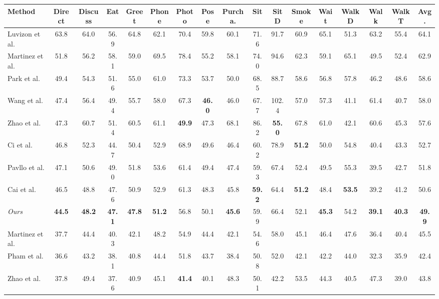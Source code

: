 \documentclass[runningheads]{llncs}
\begin{document}
\begin{table*}
\begin{center}
\resizebox{\textwidth}{30mm}
{
\begin{tabular}{ l c c c c c c c c c c c c c c c c }
\hline
Method & Direct & Discuss & Eat & Greet & Phone& Photo & Pose  & Purcha. & Sit & SitD &Smoke &Wait &WalkD&Walk& WalkT & Avg.\\
\hline
Luvizon et al. \cite{luvizon20182d}& 63.8 & 64.0 & 56.9 & 64.8 & 62.1 & 70.4 & 59.8 & 60.1&71.6 & 91.7 &60.9 & 65.1 & 51.3 & 63.2 & 55.4 & 64.1  \\ 
Martinez et al. \cite{martinez2017simple}& 51.8 &56.2 &58.1 &59.0 &69.5 &78.4 &55.2 &58.1& 74.0& 94.6 &62.3 &59.1& 65.1& 49.5& 52.4 &62.9 \\
Park et al.\cite{park20183d}&49.4 &54.3& 51.6& 55.0& 61.0 &73.3 &53.7 &50.0& 68.5& 88.7 &58.6 &56.8& 57.8& 46.2 &48.6 &58.6\\
Wang et al. \cite{wang2019generalizing}&47.4 &56.4 &49.4 &55.7& 58.0& 67.3& \textbf{46.0}& 46.0& 67.7& 102.4& 57.0& 57.3& 41.1& 61.4& 40.7 &58.0\\
Zhao et al. \cite{zhao2019semantic}&47.3 &60.7& 51.4& 60.5& 61.1 &\textbf{49.9} &47.3 &68.1& 86.2& \textbf{55.0}& 67.8& 61.0& 42.1& 60.6& 45.3& 57.6\\
Ci et al. \cite{ci2019optimizing}&46.8 &52.3& 44.7& 50.4& 52.9& 68.9& 49.6& 46.4& 60.2 &78.9& \textbf{51.2}& 50.0& 54.8& 40.4& 43.3& 52.7\\
Pavllo et al. \cite{pavllo20193d} &47.1& 50.6& 49.0& 51.8 &53.6 &61.4& 49.4 &47.4 &59.3 &67.4 &52.4& 49.5& 55.3& 39.5& 42.7& 51.8\\
Cai et al. \cite{cai2019exploiting}&46.5 &48.8 &47.6& 50.9& 52.9 &61.3 &48.3 &45.8 &\textbf{59.2} &64.4& \textbf{51.2}& 48.4& \textbf{53.5}& 39.2& 41.2& 50.6\\
\emph{Ours} &\textbf{44.5}&\textbf{48.2}&\textbf{47.1}&\textbf{47.8}&\textbf{51.2}&56.8&50.1&\textbf{45.6}&59.9&66.4&52.1&\textbf{45.3}&54.2&\textbf{39.1}&\textbf{40.3}&\textbf{49.9}\\
\hline
\hline
Martinez et al. \cite{martinez2017simple} &37.7 &44.4 &40.3 &42.1& 48.2& 54.9 &44.4 &42.1 &54.6& 58.0 &45.1 &46.4 &47.6 &36.4 &40.4& 45.5\\
Pham et al. \cite{pham2019unified} &36.6 &43.2 &38.1 &40.8 &44.4 &51.8 &43.7 &38.4 &50.8 &52.0 &42.1 &42.2 &44.0 &32.3 &35.9 &42.4\\
Zhao et al. \cite{zhao2019semantic} &37.8 &49.4 &37.6 &40.9 &45.1 &\textbf{41.4} &40.1& 48.3& 50.1 &42.2& 53.5 &44.3 &40.5 &47.3& 39.0 &43.8\\

\end{tabular}}
\end{center}
\end{table*}
\end{document}
